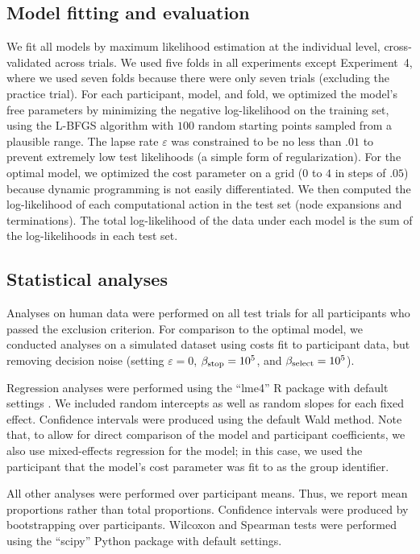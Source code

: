 \subsection{Model fitting and evaluation}\label{sec:planning-fitting}
We fit all models by maximum likelihood estimation at the individual level, cross-validated across trials. We used five folds in all experiments except Experiment~4, where we used seven folds because there were only seven trials (excluding the practice trial). For each participant, model, and fold, we optimized the model's free parameters by minimizing the negative log-likelihood on the training set, using the L-BFGS algorithm with $100$ random starting points sampled from a plausible range. The lapse rate $\varepsilon$ was constrained to be no less than $.01$ to prevent extremely low test likelihoods (a simple form of regularization). For the optimal model, we optimized the cost parameter on a grid ($0$ to $4$ in steps of $.05$) because dynamic programming is not easily differentiated. We then computed the log-likelihood of each computational action in the test set (node expansions and terminations). The total log-likelihood of the data under each model is the sum of the log-likelihoods in each test set.

\subsection{Statistical analyses}\label{sec:planning-stats}
Analyses on human data were performed on all test trials for all participants who passed the exclusion criterion. For comparison to the optimal model, we conducted analyses on a simulated dataset using costs fit to participant data, but removing decision noise (setting $\varepsilon=0$, $\beta_{\mathrm{stop}}=10^5$, and $\beta_{\mathrm{select}}=10^5$).

Regression analyses were performed using the ``lme4'' R package with default settings \citep{lme4}. We included random intercepts as well as random slopes for each fixed effect. Confidence intervals were produced using the default Wald method. Note that, to allow for direct comparison of the model and participant coefficients, we also use mixed-effects regression for the model; in this case, we used the participant that the model's cost parameter was fit to as the group identifier.

All other analyses were performed over participant means. Thus, we report mean proportions rather than total proportions. Confidence intervals were produced by bootstrapping over participants. Wilcoxon and Spearman tests were performed using the ``scipy'' Python package with default settings.



